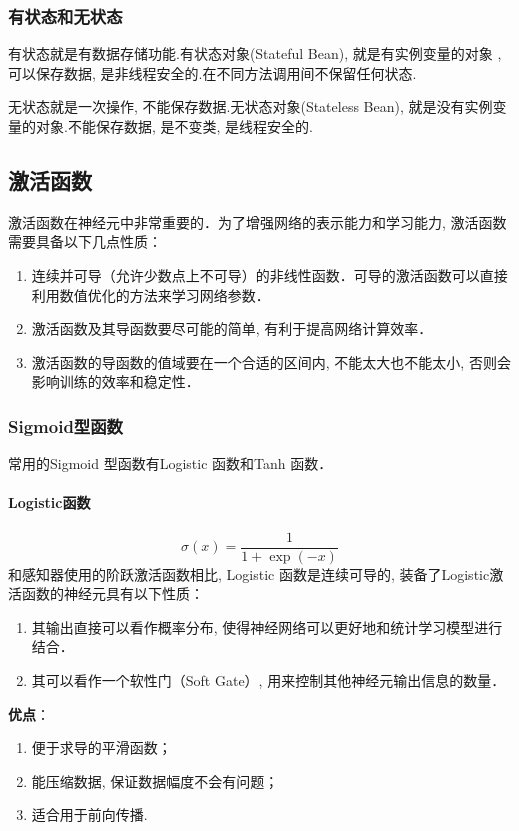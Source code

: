 \subsubsection{有状态和无状态}
有状态就是有数据存储功能.有状态对象(Stateful Bean), 就是有实例变量的对象 , 可以保存数据, 是非线程安全的.在不同方法调用间不保留任何状态.

无状态就是一次操作, 不能保存数据.无状态对象(Stateless Bean), 就是没有实例变量的对象.不能保存数据, 是不变类, 是线程安全的.
 
\subsection{激活函数}
激活函数在神经元中非常重要的．为了增强网络的表示能力和学习能力, 激活函数需要具备以下几点性质：
\begin{enumerate}
\item 连续并可导（允许少数点上不可导）的非线性函数．可导的激活函数可以直接利用数值优化的方法来学习网络参数．
\item 激活函数及其导函数要尽可能的简单, 有利于提高网络计算效率．
\item 激活函数的导函数的值域要在一个合适的区间内, 不能太大也不能太小, 否则会影响训练的效率和稳定性．
\end{enumerate}
\subsubsection{Sigmoid型函数}
常用的Sigmoid 型函数有Logistic 函数和Tanh 函数．
\paragraph{Logistic函数}
$$\sigma(x)=\frac{1}{1+\exp(-x)}$$
和感知器使用的阶跃激活函数相比, Logistic 函数是连续可导的, 
装备了Logistic激活函数的神经元具有以下性质：
\begin{enumerate}
    \renewcommand{\labelenumi}{(\theenumi)}
 \item 其输出直接可以看作概率分布, 使得神经网络可以更好地和统计学习模型进行结合． 
 \item 其可以看作一个软性门（Soft Gate）, 用来控制其他神经元输出信息的数量．
\end{enumerate}

\textbf{优点}：
\begin{enumerate}
    \renewcommand{\labelenumi}{(\theenumi)}
\item 便于求导的平滑函数；
\item 能压缩数据, 保证数据幅度不会有问题；
\item 适合用于前向传播.
\end{enumerate}

